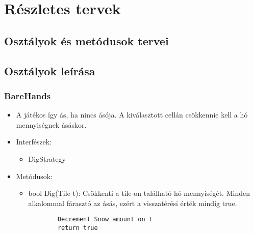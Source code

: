 %
\chapter{Részletes tervek}

\thispagestyle{fancy}

\section{Osztályok és metódusok tervei}

\lstset{
	breakatwhitespace=false,
	breaklines=true,
	tabsize=2,
	frame=L,
	numbers=left,
	basicstyle=\small\ttfamily
}

\section{Osztályok leírása}
\subsection{BareHands}
\begin{itemize}
	\item A játékos így ás, ha nincs ásója. A kiválasztott cellán csökkennie kell a hó mennyiségnek ásáskor.
	\item Interfészek:
	\begin{itemize}
		\item DigStrategy
	\end{itemize}
	\item Metódusok:
	\begin{itemize}
		\item bool Dig(Tile t): Csökkenti a tile-on található hó mennyiségét. Minden alkalommal fárasztó az ásás, ezért a visszatérési érték mindig true.
		\begin{lstlisting}
		Decrement Snow amount on t
		return true
		\end{lstlisting}
	\end{itemize}
\end{itemize}

